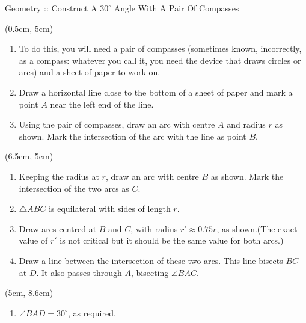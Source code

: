 \begin{frame}{Geometry :: Construct A $30^\circ$ Angle With A Pair Of Compasses}
    \begin{textblock*}{0.55\textwidth}(0.5cm, 5cm)
        \footnotesize
        \begin{enumerate}[<+-| alert@+>]
            \item To do this, you will need a pair of compasses (sometimes known, incorrectly, as a compass: whatever you call it, you need the device that draws circles or arcs) and a sheet of paper to work on.
            \item Draw a horizontal line close to the bottom of a sheet of paper and mark a point $A$ near the left end of the line.
            \item Using the pair of compasses, draw an arc with centre $A$ and radius $r$ as shown. Mark the intersection of the arc with the line as point $B$.
                  \suspend
        \end{enumerate}

    \end{textblock*}

    \begin{textblock*}{0.55\textwidth}(6.5cm, 5cm)

        \begin{enumerate}[<+-| alert@+>]
            \footnotesize
            \resume
            \item Keeping the radius at $r$, draw an arc with centre $B$ as shown. Mark the intersection of the two arcs as $C$.
            \item $\triangle ABC$ is equilateral with sides of length $r$.
            \item Draw arcs centred at $B$ and $C$, with radius $r'\approx 0.75r$, as shown.(The exact value of $r'$ is not critical but it should be the same value for both arcs.)
            \item Draw a line between the intersection of these two arcs. This line bisects $BC$ at $D$. It also passes through $A$, bisecting $\angle BAC$.
                  \suspend
        \end{enumerate}
    \end{textblock*}
    \begin{textblock*}{0.5\textwidth}(5cm, 8.6cm)
        \centering
        \begin{enumerate}
            \footnotesize
            \resume
            \item<8 | alert@8> $\angle BAD = 30^\circ$, as required. \textcolor{myGreen}{\Large\checkmark}
        \end{enumerate}
    \end{textblock*}
\end{frame}